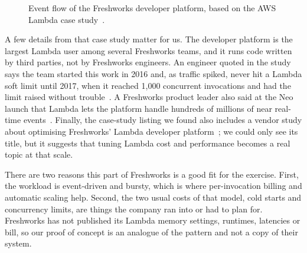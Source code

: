 \documentclass[10pt,a4paper]{article}
\begin{document}
\begin{figure}[ht]
\centering
{}
\caption{Event flow of the Freshworks developer platform, based on the AWS Lambda case study~\cite{awslambda}.}\label{fig:neo}
\end{figure}

A few details from that case study matter for us. The developer platform is the largest Lambda user among several Freshworks teams, and it runs code written by third parties, not by Freshworks engineers. An engineer quoted in the study says the team started this work in 2016 and, as traffic spiked, never hit a Lambda soft limit until 2017, when it reached 1{,}000 concurrent invocations and had the limit raised without trouble~\cite{awslambda}. A Freshworks product leader also said at the Neo launch that Lambda lets the platform handle hundreds of millions of near real-time events~\cite{neo}. Finally, the case-study listing we found also includes a vendor study about optimising Freshworks' Lambda developer platform~\cite{listing}; we could only see its title, but it suggests that tuning Lambda cost and performance becomes a real topic at that scale.

There are two reasons this part of Freshworks is a good fit for the exercise. First, the workload is event-driven and bursty, which is where per-invocation billing and automatic scaling help. Second, the two usual costs of that model, cold starts and concurrency limits, are things the company ran into or had to plan for. Freshworks has not published its Lambda memory settings, runtimes, latencies or bill, so our proof of concept is an analogue of the pattern and not a copy of their system.
\end{document}
